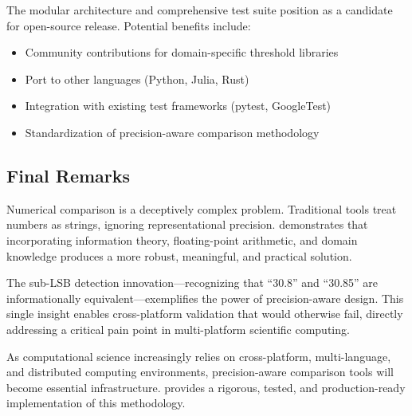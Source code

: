 The modular architecture and comprehensive test suite position \ubdiff{} as a candidate for open-source release. Potential benefits include:

\begin{itemize}
    \item Community contributions for domain-specific threshold libraries
    \item Port to other languages (Python, Julia, Rust)
    \item Integration with existing test frameworks (pytest, GoogleTest)
    \item Standardization of precision-aware comparison methodology
\end{itemize}

\subsection{Final Remarks}

Numerical comparison is a deceptively complex problem. Traditional tools treat numbers as strings, ignoring representational precision. \ubdiff{} demonstrates that incorporating information theory, floating-point arithmetic, and domain knowledge produces a more robust, meaningful, and practical solution.

The sub-LSB detection innovation—recognizing that ``30.8'' and ``30.85'' are informationally equivalent—exemplifies the power of precision-aware design. This single insight enables cross-platform validation that would otherwise fail, directly addressing a critical pain point in multi-platform scientific computing.

As computational science increasingly relies on cross-platform, multi-language, and distributed computing environments, precision-aware comparison tools will become essential infrastructure. \ubdiff{} provides a rigorous, tested, and production-ready implementation of this methodology.
